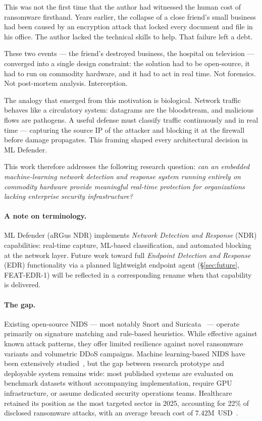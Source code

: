 \documentclass[11pt,a4paper]{article}
\begin{document}
    This was not the first time that the author had witnessed the human cost of ransomware
    firsthand. Years earlier, the collapse of a close friend's small business had been caused by
    an encryption attack that locked every document and file in his office. The author lacked the
    technical skills to help. That failure left a debt.

    These two events --- the friend's destroyed business, the hospital on television ---
    converged into a single design constraint: the solution had to be open-source, it had to run
    on commodity hardware, and it had to act in real time. Not forensics. Not post-mortem
    analysis. Interception.

    The analogy that emerged from this motivation is biological. Network traffic behaves like a
    circulatory system: datagrams are the bloodstream, and malicious flows are pathogens. A
    useful defense must classify traffic continuously and in real time --- capturing the source IP
    of the attacker and blocking it at the firewall before damage propagates. This framing shaped
    every architectural decision in ML Defender.

    This work therefore addresses the following research question: \emph{can an embedded
    machine-learning network detection and response system running entirely on commodity hardware
    provide meaningful real-time protection for organizations lacking enterprise security
    infrastructure?}

    \paragraph{A note on terminology.}
    ML Defender (aRGus NDR) implements \emph{Network Detection and Response} (NDR) capabilities:
    real-time capture, ML-based classification, and automated blocking at the network layer.
    Future work toward full \emph{Endpoint Detection and Response} (EDR) functionality via a
    planned lightweight endpoint agent (\S\ref{sec:future}, FEAT-EDR-1) will be reflected in a
    corresponding rename when that capability is delivered.

    \paragraph{The gap.}
    Existing open-source NIDS --- most notably Snort and Suricata~\cite{oisf2010} --- operate
    primarily on signature matching and rule-based heuristics. While effective against known
    attack patterns, they offer limited resilience against novel ransomware variants and volumetric
    DDoS campaigns. Machine learning-based NIDS have been extensively studied~\cite{buczak2016,
        pinto2023}, but the gap between research prototype and deployable system remains wide: most
    published systems are evaluated on benchmark datasets without accompanying implementation,
    require GPU infrastructure, or assume dedicated security operations teams. Healthcare retained
    its position as the most targeted sector in 2025, accounting for 22\% of disclosed ransomware
    attacks, with an average breach cost of 7.42M~USD~\cite{blackfog2025,ibmsecurity2025}.
\end{document}
